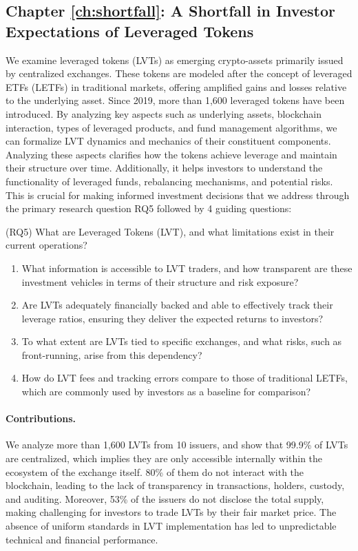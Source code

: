 \subsection{Chapter \ref{ch:shortfall}: A Shortfall in Investor Expectations of Leveraged Tokens}
We examine leveraged tokens (LVTs) as emerging crypto-assets primarily issued by centralized exchanges. These tokens are modeled after the concept of leveraged ETFs (LETFs) in traditional markets, offering amplified gains and losses relative to the underlying asset. Since 2019, more than 1,600 leveraged tokens have been introduced. By analyzing key aspects such as underlying assets, blockchain interaction, types of leveraged products, and fund management algorithms, we can formalize LVT dynamics and mechanics of their constituent components. Analyzing these aspects clarifies how the tokens achieve leverage and maintain their structure over time. Additionally, it helps investors to understand the functionality of leveraged funds, rebalancing mechanisms, and potential risks. This is crucial for making informed investment decisions that we address through the primary research question RQ5 followed by 4 guiding questions:

\noindent (RQ5) What are Leveraged Tokens (LVT), and what limitations exist in their current operations?
\begin{enumerate}[label={(RQ5.\arabic*)},leftmargin=*]
	\item What information is accessible to LVT traders, and how transparent are these investment vehicles in terms of their structure and risk exposure?
	\item  Are LVTs adequately financially backed and able to effectively track their leverage ratios, ensuring they deliver the expected returns to investors?
	\item To what extent are LVTs tied to specific exchanges, and what risks, such as front-running, arise from this dependency?
	\item How do LVT fees and tracking errors compare to those of traditional LETFs, which are commonly used by investors as a baseline for comparison?
\end{enumerate}
\paragraph{Contributions.} We analyze more than 1,600 LVTs from 10 issuers, and show that 99.9\% of LVTs are centralized, which implies they are only accessible internally within the ecosystem of the exchange itself. 80\% of them do not interact with the blockchain, leading to the lack of transparency in transactions, holders, custody, and auditing. Moreover, 53\% of the issuers do not disclose the total supply, making challenging for investors to trade LVTs by their fair market price. The absence of uniform standards in LVT implementation has led to unpredictable technical and financial performance. 

